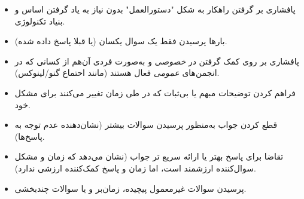 \begin{itemize}
\item
پافشاری بر گرفتن راهکار به شکل "دستورالعمل" بدون نیاز
به یاد گرفتن اساس و بنیاد تکنولوژی.

\item
بارها پرسیدن فقط یک سوال یکسان (یا قبلا پاسخ داده شده).

\item
پافشاری بر روی کمک گرفتن در {\itshape خصوصی} و به‌صورت فردی
آن‌هم از کسانی که در انجمن‌های {\itshape عمومی} فعال هستند
(مانند احتماع گنو/لینوکس).

\item
فراهم کردن توضیحات مبهم یا بی‌ثبات که در طی زمان تغییر می‌کنند
برای مشکل خود.

\item
قطع کردن جواب به‌منظور پرسیدن سوالات بیشتر
(نشان‌دهنده عدم توجه به پاسخ‌ها).

\item
تقاضا برای پاسخ بهتر یا ارائه سریع تر جواب (نشان می‌دهد
که زمان و مشکل سوال‌کننده ارزشمند است، اما زمان و پاسخ
کمک‌کننده ارزشی ندارد).

\item
پرسیدن سوالات غیرمعمول پیچیده، زمان‌بر و یا سوالات چندبخشی.
\end{itemize}

